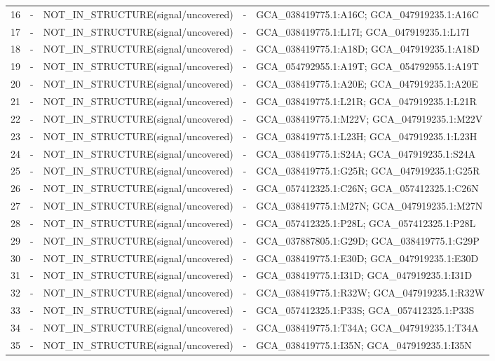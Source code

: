 \begin{longtable}{rrlrl}
16&-&NOT\_IN\_STRUCTURE(signal/uncovered)&-&GCA\_038419775.1:A16C; GCA\_047919235.1:A16C\\
17&-&NOT\_IN\_STRUCTURE(signal/uncovered)&-&GCA\_038419775.1:L17I; GCA\_047919235.1:L17I\\
18&-&NOT\_IN\_STRUCTURE(signal/uncovered)&-&GCA\_038419775.1:A18D; GCA\_047919235.1:A18D\\
19&-&NOT\_IN\_STRUCTURE(signal/uncovered)&-&GCA\_054792955.1:A19T; GCA\_054792955.1:A19T\\
20&-&NOT\_IN\_STRUCTURE(signal/uncovered)&-&GCA\_038419775.1:A20E; GCA\_047919235.1:A20E\\
21&-&NOT\_IN\_STRUCTURE(signal/uncovered)&-&GCA\_038419775.1:L21R; GCA\_047919235.1:L21R\\
22&-&NOT\_IN\_STRUCTURE(signal/uncovered)&-&GCA\_038419775.1:M22V; GCA\_047919235.1:M22V\\
23&-&NOT\_IN\_STRUCTURE(signal/uncovered)&-&GCA\_038419775.1:L23H; GCA\_047919235.1:L23H\\
24&-&NOT\_IN\_STRUCTURE(signal/uncovered)&-&GCA\_038419775.1:S24A; GCA\_047919235.1:S24A\\
25&-&NOT\_IN\_STRUCTURE(signal/uncovered)&-&GCA\_038419775.1:G25R; GCA\_047919235.1:G25R\\
26&-&NOT\_IN\_STRUCTURE(signal/uncovered)&-&GCA\_057412325.1:C26N; GCA\_057412325.1:C26N\\
27&-&NOT\_IN\_STRUCTURE(signal/uncovered)&-&GCA\_038419775.1:M27N; GCA\_047919235.1:M27N\\
28&-&NOT\_IN\_STRUCTURE(signal/uncovered)&-&GCA\_057412325.1:P28L; GCA\_057412325.1:P28L\\
29&-&NOT\_IN\_STRUCTURE(signal/uncovered)&-&GCA\_037887805.1:G29D; GCA\_038419775.1:G29P\\
30&-&NOT\_IN\_STRUCTURE(signal/uncovered)&-&GCA\_038419775.1:E30D; GCA\_047919235.1:E30D\\
31&-&NOT\_IN\_STRUCTURE(signal/uncovered)&-&GCA\_038419775.1:I31D; GCA\_047919235.1:I31D\\
32&-&NOT\_IN\_STRUCTURE(signal/uncovered)&-&GCA\_038419775.1:R32W; GCA\_047919235.1:R32W\\
33&-&NOT\_IN\_STRUCTURE(signal/uncovered)&-&GCA\_057412325.1:P33S; GCA\_057412325.1:P33S\\
34&-&NOT\_IN\_STRUCTURE(signal/uncovered)&-&GCA\_038419775.1:T34A; GCA\_047919235.1:T34A\\
35&-&NOT\_IN\_STRUCTURE(signal/uncovered)&-&GCA\_038419775.1:I35N; GCA\_047919235.1:I35N\\

\end{longtable}
